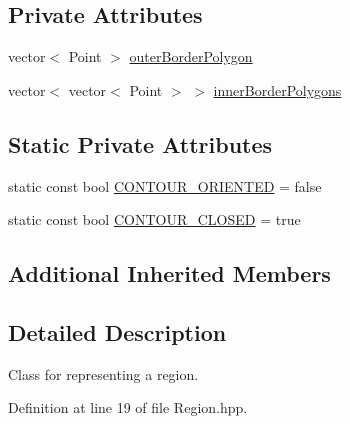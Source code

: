 \subsection*{Private Attributes}
\begin{DoxyCompactItemize}
\item 
vector$<$ Point $>$ \hyperlink{classmultiscale_1_1analysis_1_1Region_a5cf5012f0f248cc7135f04c049365fb8}{outer\-Border\-Polygon}
\item 
vector$<$ vector$<$ Point $>$ $>$ \hyperlink{classmultiscale_1_1analysis_1_1Region_adf9ce65ec31dae1083adbfed3a8f69e1}{inner\-Border\-Polygons}
\end{DoxyCompactItemize}
\subsection*{Static Private Attributes}
\begin{DoxyCompactItemize}
\item 
static const bool \hyperlink{classmultiscale_1_1analysis_1_1Region_a875a0f14dacf6904cabfa1f31020e6e2}{C\-O\-N\-T\-O\-U\-R\-\_\-\-O\-R\-I\-E\-N\-T\-E\-D} = false
\item 
static const bool \hyperlink{classmultiscale_1_1analysis_1_1Region_a52c0c66ccfe38dc19379abaeba529f19}{C\-O\-N\-T\-O\-U\-R\-\_\-\-C\-L\-O\-S\-E\-D} = true
\end{DoxyCompactItemize}
\subsection*{Additional Inherited Members}


\subsection{Detailed Description}
Class for representing a region. 

Definition at line 19 of file Region.\-hpp.



